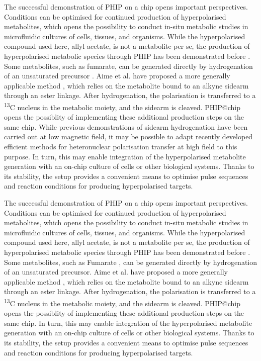 The successful demonstration of PHIP on a chip opens important perspectives.
Conditions can be optimised for continued production of hyperpolarised metabolites,
which opens the possibility to conduct in-situ metabolic studies in microfluidic
cultures of cells, tissues, and organisms.
While the hyperpolarised compound used here, allyl acetate, is not
a metabolite per se, the production of hyperpolarised metabolic species
through PHIP has been demonstrated before \cite{cavallari201813,shchepin2014parahydrogen,reineri2015parahydrogen,Ripka:2018dc,Korchak:2018ga,hovener2018parahydrogen}.
Some metabolites, such as fumarate, can be
generated directly by hydrogenation
of an unsaturated precursor \cite{Ripka:2018dc}. Aime et al. have proposed a more generally
applicable method \cite{reineri2015parahydrogen}, which relies on the metabolite bound to an alkyne sidearm
through an ester linkage. After hydrogenation, the polarisation is  transferred to a
\textsuperscript{13}C nucleus in the metabolic moiety, and the sidearm is
cleaved.  PHIP@chip opens the possiblity of implementing these additional
production steps on the same chip. While previous demonstrations of sidearm hydrogenation have been carried
out at low magnetic field, it may be possible to adapt recently developed
efficient methods for heteronuclear polarisation transfer at
high field\cite{eills2017singlet} to this purpose.
In turn, this may enable integration
of the hyperpolarised metabolite generation with an on-chip culture
of cells or other biological systems.
Thanks to its stability,
the setup provides a convenient means to optimise pulse sequences
and reaction conditions for producing hyperpolarised targets.

The successful demonstration of PHIP on a chip opens important perspectives.
Conditions can be optimised for continued production of hyperpolarised metabolites,
which opens the possibility to conduct in-situ metabolic studies in microfluidic
cultures of cells, tissues, and organisms.
While the hyperpolarised compound used here, allyl acetate, is not
a metabolite per se, the production of hyperpolarised metabolic species
through PHIP has been demonstrated before \cite{cavallari201813,shchepin2014parahydrogen,reineri2015parahydrogen,Ripka:2018dc,Korchak:2018ga,Hovener:2018cg}.
Some metabolites, such as Fumarate \cite{Ripka:2018dc}, can be
 generated directly by hydrogenation
of an unsaturated precursor. Aime et al. have proposed a more generally
applicable method \cite{reineri2015parahydrogen}, which relies on the metabolite bound to an alkyne sidearm
through an ester linkage. After hydrogenation, the polarisation is  transferred to a
 \textsuperscript{13}C nucleus in the metabolic moiety, and the sidearm is
 cleaved. PHIP@chip opens the possiblity of implementing these additional
production steps on the same chip. In turn, this may enable integration
of the hyperpolarised metabolite generation with an on-chip culture
of cells or other biological systems.
Thanks to its stability,
the setup provides a convenient means to optimise pulse sequences
and reaction conditions for producing hyperpolarised targets.
